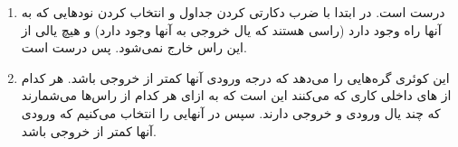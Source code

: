 \begin{enumerate}
    \item درست است. در ابتدا با ضرب دکارتی کردن جداول و انتخاب کردن نود‌هایی که به آنها راه وجود دارد
    (راسی هستند که یال خروجی به آنها وجود دارد)
    و هیچ یالی از این راس خارج نمی‌شود. پس درست است.
    \item این کوئری گره‌هایی را می‌دهد که درجه ورودی آنها کمتر از خروجی باشد.
    هر کدام از
    های
    داخلی کاری که می‌کنند این است که به ازای هر کدام از راس‌ها می‌شمارند که چند یال ورودی و خروجی دارند.
    سپس در
    آنهایی را انتخاب می‌کنیم که ورودی آنها کمتر از خروجی باشد.
\end{enumerate}



